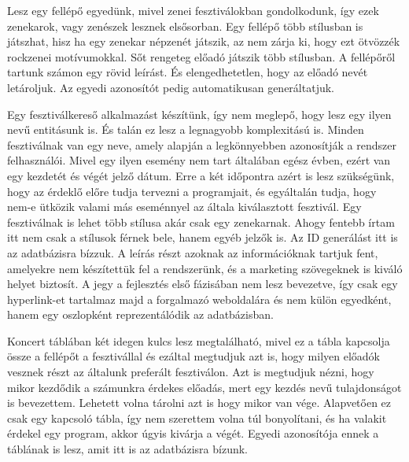 Lesz egy fellépő egyedünk, mivel zenei fesztiválokban gondolkodunk, így ezek zenekarok, vagy zenészek lesznek elsősorban. Egy fellépő több stílusban is játszhat, hisz ha egy zenekar népzenét játszik, az nem zárja ki, hogy ezt ötvözzék rockzenei motívumokkal. Sőt rengeteg előadó játszik több stílusban. A fellépőről tartunk számon egy rövid leírást. És elengedhetetlen, hogy az előadó nevét letároljuk. Az egyedi azonosítót pedig automatikusan generáltatjuk. 

Egy fesztiválkereső alkalmazást készítünk, így nem meglepő, hogy lesz egy ilyen nevű entitásunk is. És talán ez lesz a legnagyobb komplexitású is. Minden fesztiválnak van egy neve, amely alapján a legkönnyebben azonosítják a rendszer felhasználói. Mivel egy ilyen esemény nem tart általában egész évben, ezért van egy kezdetét és végét jelző dátum. Erre a két időpontra azért is lesz szükségünk, hogy az érdeklő előre tudja  tervezni a programjait, és egyáltalán tudja, hogy nem-e ütközik valami más eseménnyel az általa kiválasztott fesztivál. Egy fesztiválnak is lehet több stílusa akár csak egy zenekarnak. Ahogy fentebb írtam itt nem csak a stílusok férnek bele, hanem egyéb jelzők is. Az ID generálást itt is az adatbázisra bízzuk. A leírás részt azoknak az információknak tartjuk fent, amelyekre nem készítettük fel a rendszerünk, és a marketing szövegeknek is kiváló helyet biztosít. A jegy a fejlesztés első fázisában nem lesz bevezetve, így csak egy hyperlink-et tartalmaz majd a forgalmazó weboldalára és nem külön egyedként, hanem egy oszlopként reprezentálódik az adatbázisban.

Koncert táblában két idegen kulcs lesz megtalálható, mivel ez a tábla kapcsolja össze a fellépőt a fesztivállal és ezáltal megtudjuk azt is, hogy milyen előadók vesznek részt az általunk preferált fesztiválon. Azt is megtudjuk nézni, hogy mikor kezdődik a számunkra érdekes előadás, mert egy kezdés nevű tulajdonságot is bevezettem. Lehetett volna tárolni azt is hogy mikor van vége. Alapvetően ez csak egy kapcsoló tábla, így nem szerettem volna túl bonyolítani, és ha valakit érdekel egy program, akkor úgyis kivárja a végét. Egyedi azonosítója ennek a táblának is lesz, amit itt is az adatbázisra bízunk.

